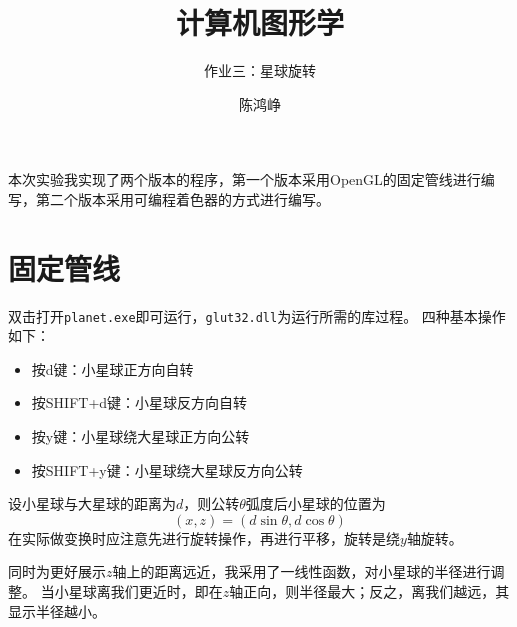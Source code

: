 \documentclass[logo,reportComp]{thesis}
\title{计算机图形学}
\subtitle{作业三：星球旋转}
\author{陈鸿峥}
\begin{document}
\maketitle

本次实验我实现了两个版本的程序，第一个版本采用OpenGL的固定管线进行编写，第二个版本采用可编程着色器的方式进行编写。

\section{固定管线}
双击打开\verb'planet.exe'即可运行，\verb'glut32.dll'为运行所需的库过程。
四种基本操作如下：
\begin{itemize}
	\item 按d键：小星球正方向自转
	\item 按SHIFT+d键：小星球反方向自转
	\item 按y键：小星球绕大星球正方向公转
	\item 按SHIFT+y键：小星球绕大星球反方向公转
\end{itemize}

设小星球与大星球的距离为$d$，则公转$\theta$弧度后小星球的位置为
\[(x,z)=(d\sin\theta, d\cos\theta)\]
在实际做变换时应注意先进行旋转操作，再进行平移，旋转是绕$y$轴旋转。

同时为更好展示$z$轴上的距离远近，我采用了一线性函数，对小星球的半径进行调整。
当小星球离我们更近时，即在$z$轴正向，则半径最大；反之，离我们越远，其显示半径越小。
\end{document}
